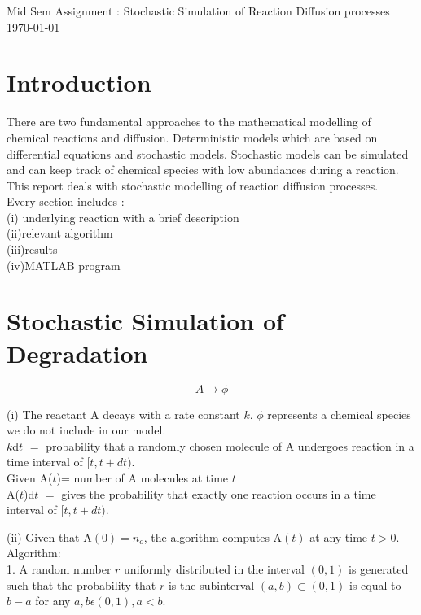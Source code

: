\documentclass[10 pt]{article}
\begin{document}
\begin{multicols}{2}
\begin{center}
Mid Sem Assignment : Stochastic Simulation of Reaction Diffusion processes \\
\today \\
\end{center}

\section{Introduction}
There are two fundamental approaches to the mathematical modelling of chemical reactions and diffusion. Deterministic models which are based on differential equations and stochastic models. Stochastic models can be simulated and can keep track of chemical species with low abundances during a reaction. \\
This report deals with stochastic modelling of reaction diffusion processes.\\
Every section includes :\\
(i) underlying reaction with a brief description\\
(ii)relevant algorithm\\
(iii)results \\
(iv)MATLAB program
\section{Stochastic Simulation of Degradation}
\begin{equation}\label{eq:1}
A \rightarrow \phi
\end{equation} 
\begin{flushleft}
(i)
The reactant A decays with a rate constant $k$. $\phi$ represents a chemical species we do not include in our model. \\
$k$d$t$ $=$ probability that a randomly chosen molecule of A undergoes reaction in a time interval of $[t,t+dt)$.\\
Given A($t$)= number of A molecules at time $t$\\
A($t$)d$t$ $=$ gives the probability that exactly one reaction occurs in a time interval of $[t,t+dt)$.\\
\end{flushleft}
\begin{flushleft}
(ii)
Given that A$(0) = n_{o}$, the algorithm computes A$(t)$ at any time $t>0$. 
Algorithm:\\
 1. A random number $r$ uniformly distributed in the interval $(0,1)$ is generated such that the probability that $r$ is the subinterval $(a,b)\subset(0,1)$ is equal to $b-a$ for any $a,b \epsilon (0,1), a< b$.


\end{flushleft}
\end{multicols}
\end{document}
